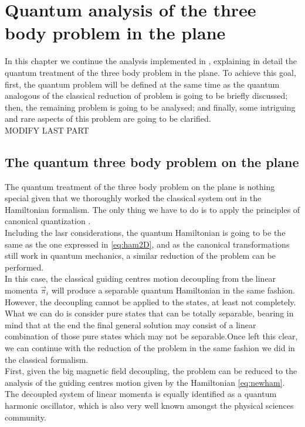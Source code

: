\chapter{Quantum analysis of the three body problem in the plane}
In this chapter we continue the analysis implemented in \cite{botero}, explaining in detail the quantum treatment of the three body problem in the plane. To achieve this goal, first, the quantum problem will be defined at the same time as the quantum analogous of the classical reduction of problem is going to be briefly discussed; then, the remaining problem is going to be analysed; and finally, some intriguing and rare aspects of this problem are going to be clarified.\\

MODIFY LAST PART
\section{The quantum three body problem on the plane}
The quantum treatment of the three body problem on the plane is nothing special given that we thoroughly worked the classical system out in the Hamiltonian formalism. The only thing we have to do is to apply the principles of canonical quantization \cite{Canonical quantization}. \\

Including the lasr considerations, the quantum Hamiltonian is going to be the same as the one expressed in \eqref{eq:ham2D}, and as the canonical transformations still work in quantum mechanics, a similar reduction of the problem can be performed.\\

In this case, the classical guiding centres motion decoupling from the linear momenta $\vec{\pi}_i$ will produce a separable quantum Hamiltonian in the same fashion. However, the decoupling cannot be applied to the states, at least not completely. What we can do is consider pure states that can be totally separable, bearing in mind that at the end the final general solution  may consist of a linear combination of those pure states which may not be separable.Once left this clear, we can continue with the reduction of the problem in the same fashion we did in the classical formalism.\\

First, given the big magnetic field decoupling, the problem can be reduced to the analysis of the guiding centres motion given by the Hamiltonian \eqref{eq:newham}. The decoupled system of linear momenta is equally identified as a quantum harmonic oscillator, which is also very well known amongst the physical sciences community.\\

